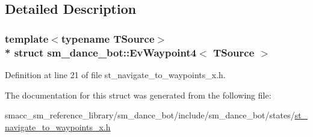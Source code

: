 \subsection{Detailed Description}
\subsubsection*{template$<$typename T\+Source$>$\\*
struct sm\+\_\+dance\+\_\+bot\+::\+Ev\+Waypoint4$<$ T\+Source $>$}



Definition at line 21 of file st\+\_\+navigate\+\_\+to\+\_\+waypoints\+\_\+x.\+h.



The documentation for this struct was generated from the following file\+:\begin{DoxyCompactItemize}
\item 
smacc\+\_\+sm\+\_\+reference\+\_\+library/sm\+\_\+dance\+\_\+bot/include/sm\+\_\+dance\+\_\+bot/states/\hyperlink{st__navigate__to__waypoints__x_8h}{st\+\_\+navigate\+\_\+to\+\_\+waypoints\+\_\+x.\+h}\end{DoxyCompactItemize}

